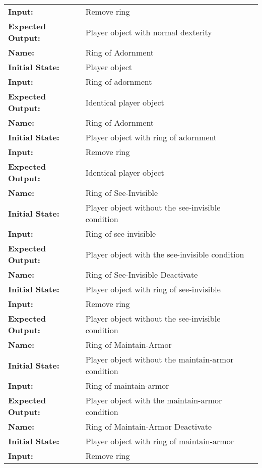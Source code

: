\documentclass[12pt, titlepage]{article}
\begin{document}
\begin{center}
\begin{longtable}{ l | p{10cm} }
				\textbf{Input:} & Remove ring\\
				\textbf{Expected Output:} & Player object with normal dexterity\\[1em]
				\hline
				\rule{0pt}{2em}\textbf{Name:} & Ring of Adornment\\
				\textbf{Initial State:} & Player object\\
				\textbf{Input:} & Ring of adornment\\
				\textbf{Expected Output:} & Identical player object\\[1em]
				\hline
				\rule{0pt}{2em}\textbf{Name:} & Ring of Adornment\\
				\textbf{Initial State:} & Player object with ring of adornment\\
				\textbf{Input:} & Remove ring\\
				\textbf{Expected Output:} & Identical player object\\[1em]
				\hline
				\rule{0pt}{2em}\textbf{Name:} & Ring of See-Invisible\\
				\textbf{Initial State:} & Player object without the see-invisible condition\\
				\textbf{Input:} & Ring of see-invisible\\
				\textbf{Expected Output:} & Player object with the see-invisible condition\\[1em]
				\hline
				\rule{0pt}{2em}\textbf{Name:} & Ring of See-Invisible Deactivate\\
				\textbf{Initial State:} & Player object with ring of see-invisible\\
				\textbf{Input:} & Remove ring\\
				\textbf{Expected Output:} & Player object without the see-invisible condition\\[1em]
				\hline
				\rule{0pt}{2em}\textbf{Name:} & Ring of Maintain-Armor\\
				\textbf{Initial State:} & Player object without the maintain-armor condition\\
				\textbf{Input:} & Ring of maintain-armor\\
				\textbf{Expected Output:} & Player object with the maintain-armor condition\\[1em]
				\hline
				\rule{0pt}{2em}\textbf{Name:} & Ring of Maintain-Armor Deactivate\\
				\textbf{Initial State:} & Player object with ring of maintain-armor\\
				\textbf{Input:} & Remove ring\\

\end{longtable}
\end{center}
\end{document}
